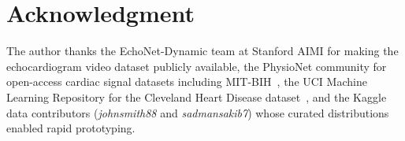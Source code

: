\documentclass[journal,10pt,twoside]{IEEEtran}
\begin{document}
\section*{Acknowledgment}

The author thanks the EchoNet-Dynamic team at Stanford AIMI for making the
echocardiogram video dataset publicly available, the PhysioNet community for
open-access cardiac signal datasets including MIT-BIH~\cite{moody2001},
the UCI Machine Learning Repository for the Cleveland Heart Disease
dataset~\cite{uci_heart,detrano1989}, and the Kaggle data contributors
(\textit{johnsmith88} and \textit{sadmansakib7}) whose curated distributions
enabled rapid prototyping.

\balance  %


\end{document}
